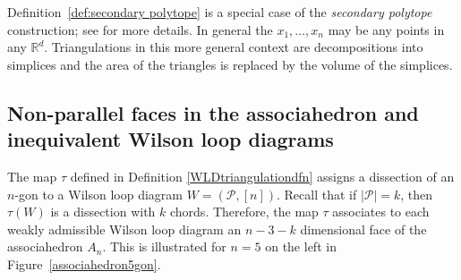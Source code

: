 \documentclass[11pt]{article}
\newcommand{\cP}{\mathcal{P}}
\theoremstyle{remark}
\theoremstyle{definition}
\begin{document}
Definition~\ref{def:secondary polytope} is a special case of the {\em secondary polytope} construction; see \cite[Definition 9.9]{Ziegler} for more details.  In general the $x_1, \ldots, x_n$ may be any points in any $\mathbb{R}^d$.  Triangulations in this more general context are decompositions into simplices and the area of the triangles is replaced by the volume of the simplices.  




\subsection{Non-parallel faces in the associahedron and inequivalent Wilson loop diagrams}\label{sec associahedron results}

The map $\tau$ defined in Definition \ref{WLDtriangulationdfn} assigns a dissection of an $n$-gon to a Wilson loop diagram $W = (\cP, [n])$. Recall that if $|\cP| = k$, then $\tau(W)$ is a dissection with $k$ chords. Therefore, the map $\tau$ associates to each weakly admissible Wilson loop diagram an $n-3 - k$ dimensional face of the associahedron $A_n$. This is illustrated for $n=5$ on the left in Figure~\ref{associahedron5gon}.
\end{document}
